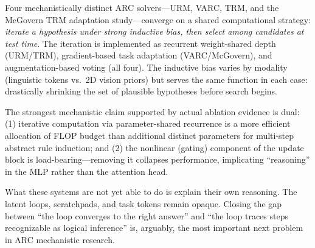 \documentclass[11pt, letterpaper]{article}
\begin{document}
Four mechanistically distinct ARC solvers---URM, VARC, TRM, and the
McGovern TRM adaptation study---converge on a shared computational
strategy: \emph{iterate a hypothesis under strong inductive bias, then
select among candidates at test time}. The iteration is implemented as
recurrent weight-shared depth (URM/TRM), gradient-based task adaptation
(VARC/McGovern), and augmentation-based voting (all four). The inductive
bias varies by modality (linguistic tokens vs.\ 2D vision priors) but
serves the same function in each case: drastically shrinking the set of
plausible hypotheses before search begins.

The strongest mechanistic claim supported by actual ablation evidence is
dual: (1) iterative computation via parameter-shared recurrence is a more
efficient allocation of FLOP budget than additional distinct parameters for
multi-step abstract rule induction; and (2) the nonlinear (gating) component
of the update block is load-bearing---removing it collapses performance,
implicating ``reasoning'' in the MLP rather than the attention head.

What these systems are not yet able to do is explain their own reasoning.
The latent loops, scratchpads, and task tokens remain opaque. Closing the
gap between ``the loop converges to the right answer'' and ``the loop traces
steps recognizable as logical inference'' is, arguably, the most important
next problem in ARC mechanistic research.



\end{document}
